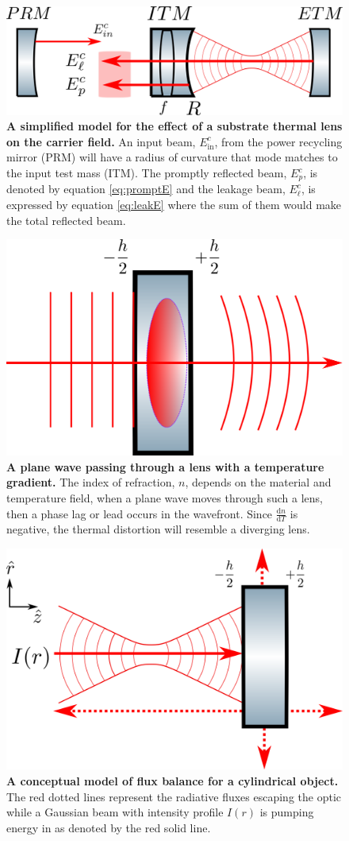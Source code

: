 \begin{figure}[ht]
	\centering
	\includegraphics[width=.7 \textwidth]{../Figures/ThermalLensFP.png}
	\caption[A simplified model for the effect of a substrate thermal lens on the carrier field.]  
	{\textbf{A simplified model for the effect of a substrate thermal lens on the carrier field.} An input beam, $E_{\text{in}}^{c}$, from the power recycling mirror (PRM) will have a radius of curvature that mode matches to the input test mass (ITM).  The promptly reflected beam, $E_{p}^{c}$, is denoted by equation \ref{eq:promptE} and the leakage beam, $E_{\ell}^{c}$, is expressed by equation \ref{eq:leakE} where the sum of them would make the total reflected beam.}
	\label{fig:ThermalLensFP}
\end{figure}

\begin{figure}[ht]
	\centering
	\includegraphics[width=.4 \textwidth]{../Figures/ThermalLensWF.png}
	\caption[A plane wave passing through a lens with a temperature gradient.]  
	{\textbf{A plane wave passing through a lens with a temperature gradient.} The index of refraction, $n$, depends on the material and temperature field, when a plane wave moves through such a lens, then a phase lag or lead occurs in the wavefront. Since $\frac{\text{d}n}{\text{d}T}$ is negative, the thermal distortion will resemble a diverging lens.}
	\label{fig:ThermalLensWF}
\end{figure}

\begin{figure}[ht]
	\centering
	\includegraphics[width=.6 \textwidth]{../Figures/ThermalLensFlux.png}
	\caption[A conceptual model of flux balance for a cylindrical object.]  
	{\textbf{A conceptual model of flux balance for a cylindrical object.} The red dotted lines represent the radiative fluxes escaping the optic while a Gaussian beam with intensity profile $I(r)$ is pumping energy in as denoted by the red solid line.}
	\label{fig:ThermalLensFlux}
\end{figure}

